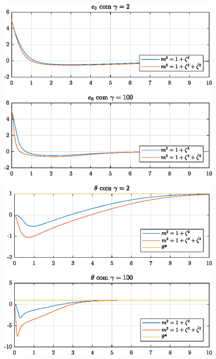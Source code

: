 \begin{figure}[H]
  \centering
  \includegraphics[width=12cm]{figs/e0/gamma2gamma100.eps}
\end{figure}

\begin{figure}[H]
  \centering
  \includegraphics[width=12cm]{figs/theta/gamma2gamma100.eps} 
\end{figure}

